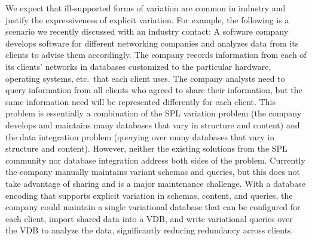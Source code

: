 We expect that ill-supported forms of variation are common in industry and
justify the expressiveness of explicit variation. For example, the following is
a scenario we recently discussed with an industry contact:
%
A software company develops software for different networking companies and
analyzes data from its clients to advise them accordingly. 
%
The company records information from each of its clients' networks in databases
customized to the particular hardware, operating systems, etc.\ that each
client uses.
%
The company analysts need to query information from all clients who agreed to
share their information, but the same information need will be represented
differently for each client.
%
This problem is essentially a combination of the SPL variation problem (the
company develops and maintains many databases that vary in structure and
content) and the data integration problem (querying over many databases that
vary in structure and content). However, neither the existing solutions from
the SPL community nor database integration address both sides of the problem.
%
Currently the company manually maintains variant schemas and queries, but this
does not take advantage of sharing and is a major maintenance challenge.
%
With a database encoding that supports explicit variation in schemas, content,
and queries, the company could maintain a single variational database that can
be configured for each client, import shared data into a VDB, and write
variational queries over the VDB to analyze the data, significantly reducing redundancy
across clients.
%



